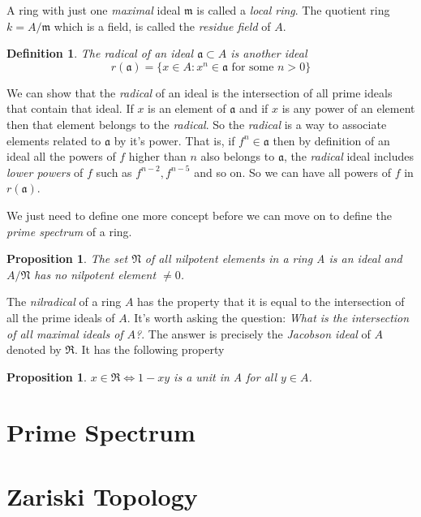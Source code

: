 \documentclass[]{report}
\newtheorem{prop}[theorem]{Proposition}
\newtheorem{defn}[theorem]{Definition}
\begin{document}
A ring with just one \textit{maximal} ideal $\mathfrak{m}$ is called a \textit{local ring}. The quotient ring $k = A/\mathfrak{m}$ which is a field, is called the \textit{residue field} of $A$. 

\begin{defn}
    The radical of an ideal $\mathfrak{a}\subset A$ is another ideal 
    $$r(\mathfrak{a}) = \{x\in A: x^n\in \mathfrak{a} \text{ for some } n>0\}$$
\end{defn}

We can show that the \textit{radical} of an ideal is the intersection of all prime ideals that contain that ideal. If $x$ is an element of $\mathfrak{a}$ and if $x$ is any power of an element then that element belongs to the \textit{radical}. So the \textit{radical} is a way to associate elements related to $\mathfrak{a}$ by it's power. That is, if $f^n\in \mathfrak{a}$ then by definition of an ideal all the powers of $f$ higher than $n$ also belongs to $\mathfrak{a}$, the \textit{radical} ideal includes \textit{lower powers} of $f$ such as $f^{n-2}, f^{n-5}$ and so on. So we can have all powers of $f$ in $r(\mathfrak{a})$. 

We just need to define one more concept before we can move on to define the \textit{prime spectrum} of a ring. 

\begin{prop}
    The set $\mathfrak{N}$ of all nilpotent elements in a ring A is an ideal and $A/\mathfrak{N}$ has no nilpotent element $\neq 0$. \cite{atiyah1}
\end{prop}

The \textit{nilradical} of a ring $A$ has the property that it is equal to the intersection of all the prime ideals of $A$. It's worth asking the question: \textit{What is the intersection of all maximal ideals of $A$?}. The answer is precisely the \textit{Jacobson ideal} of $A$ denoted by $\mathfrak{R}$. It has the following property

\begin{prop}
    $x\in \mathfrak{R} \Leftrightarrow 1-xy$ is a unit in A for all $y\in A$. \cite{atiyah1}
\end{prop}



\section{Prime Spectrum}
\section{Zariski Topology}
\end{document}
